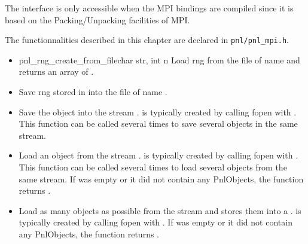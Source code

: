 The interface is only accessible when the MPI bindings are compiled since it
is based on the Packing/Unpacking facilities of MPI.

The functionnalities described in this chapter are declared in \verb!pnl/pnl_mpi.h!.
\begin{itemize}
\item \describefun{\PnlRng\ptr \ptr}
  {pnl_rng_create_from_file}{char \ptr str, int n}
  \sshortdescribe Load  rng from the file of name  and
  returns an array of  \PnlRng.
\item {}
    \sshortdescribe Save  rng stored in  into the file of
  name .
\item {}
  \sshortdescribe Save the object  into the stream . 
  is typically created by calling fopen with . This function can be
  called several times to save several objects in the same stream.
\item {}
  \sshortdescribe Load an object from the stream . 
  is typically created by calling fopen with .  This function can be
  called several times to load several objects from the same stream. If 
  was empty or it did not contain any PnlObjects, the function returns .
\item {}
  \sshortdescribe Load as many objects as possible from the stream  and
  stores them into a \PnlList.  is typically created by
  calling fopen with . If  was empty or it did not contain
  any PnlObjects, the function returns .
\end{itemize}


